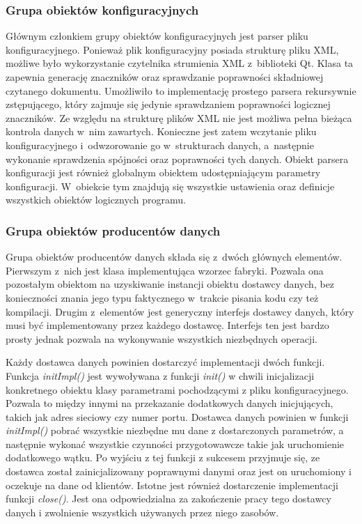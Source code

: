 \subsubsection[Grupa obiektów konfiguracyjnych][Grupa obiektów
konfiguracyjnych]{Grupa obiektów konfiguracyjnych}

Głównym członkiem grupy obiektów konfiguracyjnych jest parser pliku
konfiguracyjnego. Ponieważ plik konfiguracyjny posiada strukturę pliku
XML, możliwe było wykorzystanie czytelnika strumienia XML z~biblioteki
Qt. Klasa ta zapewnia generację znaczników oraz sprawdzanie
poprawności składniowej czytanego dokumentu. Umożliwiło to
implementację prostego parsera rekursywnie zstępującego, który zajmuje
się jedynie sprawdzaniem poprawności logicznej znaczników. Ze względu
na strukturę plików XML nie jest możliwa pełna bieżąca kontrola
danych w~nim zawartych. Konieczne jest zatem wczytanie pliku
konfiguracyjnego i~odwzorowanie go w~strukturach danych, a~następnie
wykonanie sprawdzenia spójności oraz poprawności tych danych. Obiekt
parsera konfiguracji jest również globalnym obiektem udostępniającym
parametry konfiguracji. W~obiekcie tym znajdują się wszystkie
ustawienia oraz definicje wszystkich obiektów logicznych programu.

\subsubsection[Grupa obiektów producentów danych][Grupa obiektów
producentów danych]{Grupa obiektów producentów danych}

Grupa obiektów producentów danych składa się z~dwóch głównych
elementów. Pierwszym z~nich jest klasa implementująca wzorzec
fabryki. Pozwala ona pozostałym obiektom na uzyskiwanie instancji
obiektu dostawcy danych, bez konieczności znania jego typu faktycznego
w~trakcie pisania kodu czy też kompilacji. Drugim z~elementów jest
generyczny interfejs dostawcy danych, który musi być implementowany
przez każdego dostawcę. Interfejs ten jest bardzo prosty jednak
pozwala na wykonywanie wszystkich niezbędnych operacji.

Każdy dostawca danych powinien dostarczyć implementacji dwóch
funkcji. Funkcja {\em initImpl()} jest wywoływana z funkcji {\em
  init()} w chwili inicjalizacji konkretnego obiektu klasy parametrami
pochodzącymi z pliku konfiguracyjnego. Pozwala to między innymi na
przekazanie dodatkowych danych inicjujących, takich jak adres sieciowy
czy numer portu. Dostawca danych powinien w funkcji {\em initImpl()}
pobrać wszystkie niezbędne mu dane z dostarczonych parametrów, a
następnie wykonać wszystkie czynności przygotowawcze takie jak
uruchomienie dodatkowego wątku. Po wyjściu z tej funkcji z sukcesem
przyjmuje się, ze dostawca został zainicjalizowany poprawnymi danymi
oraz jest on uruchomiony i oczekuje na dane od klientów. Istotne jest
również dostarczenie implementacji funkcji {\em close()}. Jest ona
odpowiedzialna za zakończenie pracy tego dostawcy danych i zwolnienie
wszystkich używanych przez niego zasobów.

